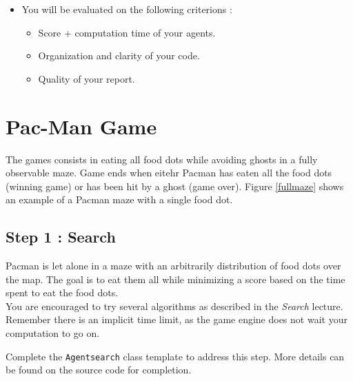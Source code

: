 \documentclass[12pt,a4paper,BCOR12mm, headexclude, footexclude, twoside, openright]{scrartcl}
\numberwithin{equation}{section} %
\numberwithin{figure}{section} %
\numberwithin{table}{section} %
\begin{document}
\begin{itemize}
	\item You will be evaluated on the following criterions : 
    \begin{itemize}
		\item Score + computation time of your agents.
        \item Organization and clarity of your code.
        \item Quality of your report.
	\end{itemize}
\end{itemize}

\section{Pac-Man Game}

The games consists in eating all food dots while avoiding ghosts in a fully observable maze. Game ends when eitehr Pacman has eaten all the food dots (winning game) or has been hit by a ghost (game over). Figure \ref{fullmaze} shows an example of a Pacman maze with a single food dot. 

\subsection{Step 1 : Search}

Pacman is let alone in a maze with an arbitrarily distribution of food dots over the map. The goal is to eat them all while minimizing a score based on the time spent to eat the food dots.\\

You are encouraged to try several algorithms as described in the \emph{Search} lecture. Remember there is an implicit time limit, as the game engine does not wait your computation to go on.

Complete the \texttt{Agentsearch} class template to address this step. More details can be found on the source code for completion.
\end{document}
